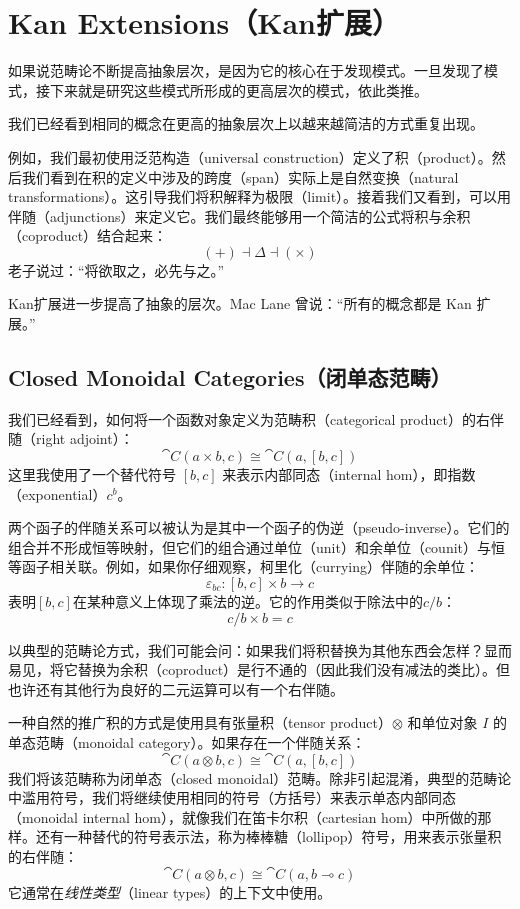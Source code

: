 \documentclass[DaoFP]{subfiles}
\begin{document}
 \setcounter{chapter}{18}

 \chapter{Kan Extensions（Kan扩展）}

 如果说范畴论不断提高抽象层次，是因为它的核心在于发现模式。一旦发现了模式，接下来就是研究这些模式所形成的更高层次的模式，依此类推。

 我们已经看到相同的概念在更高的抽象层次上以越来越简洁的方式重复出现。

 例如，我们最初使用泛范构造（universal construction）定义了积（product）。然后我们看到在积的定义中涉及的跨度（span）实际上是自然变换（natural transformations）。这引导我们将积解释为极限（limit）。接着我们又看到，可以用伴随（adjunctions）来定义它。我们最终能够用一个简洁的公式将积与余积（coproduct）结合起来：
 \[ (+) \dashv \Delta \dashv (\times) \]
 老子说过：“将欲取之，必先与之。”

 Kan扩展进一步提高了抽象的层次。Mac Lane 曾说：“所有的概念都是 Kan 扩展。”

 \section{Closed Monoidal Categories（闭单态范畴）}

 我们已经看到，如何将一个函数对象定义为范畴积（categorical product）的右伴随（right adjoint）：
 \[ \cat C (a \times b, c) \cong \cat C (a, [b, c]) \]
 这里我使用了一个替代符号 $[b, c]$ 来表示内部同态（internal hom），即指数（exponential）$c^b$。

 两个函子的伴随关系可以被认为是其中一个函子的伪逆（pseudo-inverse）。它们的组合并不形成恒等映射，但它们的组合通过单位（unit）和余单位（counit）与恒等函子相关联。例如，如果你仔细观察，柯里化（currying）伴随的余单位：
 \[ \varepsilon_{b c} \colon [b, c] \times b \to c \]
 表明$[b, c]$在某种意义上体现了乘法的逆。它的作用类似于除法中的$c/b$：
 \[ c/b \times b = c \]

 以典型的范畴论方式，我们可能会问：如果我们将积替换为其他东西会怎样？显而易见，将它替换为余积（coproduct）是行不通的（因此我们没有减法的类比）。但也许还有其他行为良好的二元运算可以有一个右伴随。

 一种自然的推广积的方式是使用具有张量积（tensor product）$\otimes$ 和单位对象 $I$ 的单态范畴（monoidal category）。如果存在一个伴随关系：
 \[ \cat C (a \otimes b, c) \cong \cat C (a, [b, c]) \]
 我们将该范畴称为闭单态（closed monoidal）范畴。除非引起混淆，典型的范畴论中滥用符号，我们将继续使用相同的符号（方括号）来表示单态内部同态（monoidal internal hom），就像我们在笛卡尔积（cartesian hom）中所做的那样。还有一种替代的符号表示法，称为棒棒糖（lollipop）符号，用来表示张量积的右伴随：
 \[ \cat C (a \otimes b, c) \cong \cat C (a, b \multimap c) \]
 它通常在\emph{线性类型}（linear types）的上下文中使用。
\end{document}
